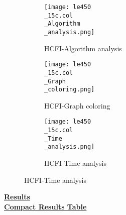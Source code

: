 \documentclass[10pt]{article}
\begin{document}
\graphicspath{{./Core1/Solutions/HCFI/le450\_15c.col}}
\begin{figure}[H]
\begin{subfigure}{.33\textwidth}
  \centering
  \texttt{[image: le450\\\_15c.col\\\_Algorithm\\\_analysis.png]}
  \caption{HCFI-Algorithm analysis}
   \label{fig:subfig1}
\end{subfigure}%
\begin{subfigure}{.33\textwidth}
  \centering
  \texttt{[image: le450\\\_15c.col\\\_Graph\\\_coloring.png]}
  \caption{HCFI-Graph coloring}
  \label{fig:subfig2}
\end{subfigure}
\begin{subfigure}{.33\textwidth}
  \centering
  \texttt{[image: le450\\\_15c.col\\\_Time\\\_analysis.png]}
  \caption{HCFI-Time analysis}
  \end{subfigure}
\end{figure}
\vspace{2cm}
\begin{center}
\hyperlink{page.8}{\textbf{Results}}\\
\vspace{0.5cm}
\hyperlink{page.71}{\textbf{Compact Results Table}}
\end{center}
\pagebreak
\end{document}
